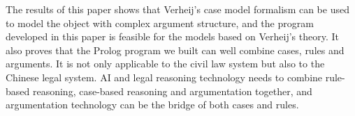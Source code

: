\documentclass{IOS-Book-Article}
\begin{document}
The results of this paper shows that Verheij's case model formalism can be used to model the object with complex argument structure, and the program developed in this paper is feasible for the models based on Verheij's theory. It also proves that the Prolog program we built can well combine cases, rules and arguments. It is not only applicable to the civil law system but also to the Chinese legal system. AI and legal reasoning technology needs to combine rule-based reasoning, case-based reasoning and argumentation together, and argumentation technology can be the bridge of both cases and rules.

\footnotesize


\normalsize
\end{document}
